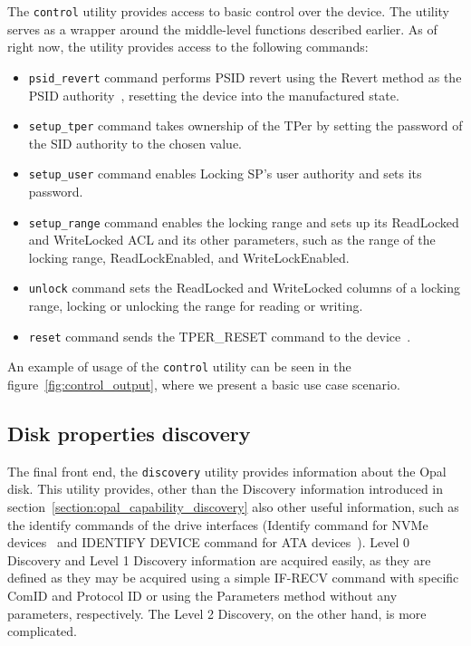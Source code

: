 The \verb|control| utility provides access to basic control over the device.
The utility serves as a wrapper around the middle-level functions described earlier.
As of right now, the utility provides access to the following commands:

\begin{itemize}
    \item \verb|psid_revert| command performs PSID revert using the Revert method as the PSID authority~\cite{tcg-psid}, resetting the device into the manufactured state.
    \item \verb|setup_tper| command takes ownership of the TPer by setting the password of the SID authority to the chosen value.
    \item \verb|setup_user| command enables Locking SP's user authority and sets its password.
    \item \verb|setup_range| command enables the locking range and sets up its ReadLocked and WriteLocked ACL and its other parameters, such as the range of the locking range, ReadLockEnabled, and WriteLockEnabled.
    \item \verb|unlock| command sets the ReadLocked and WriteLocked columns of a locking range, locking or unlocking the range for reading or writing.
    \item \verb|reset| command sends the TPER\_RESET command to the device~\cite{tcg-storage-core}.
\end{itemize}

An example of usage of the \verb|control| utility can be seen in the figure~\ref{fig:control_output}, where we present a basic use case scenario.

\subsection{Disk properties discovery}
\label{utility_discovery}

The final front end, the \verb|discovery| utility provides information about the Opal disk.
This utility provides, other than the Discovery information introduced in section~\ref{section:opal_capability_discovery} also other useful information, such as the identify commands of the drive interfaces (Identify command for NVMe devices~\cite{nvme-express-base-specification} and IDENTIFY DEVICE command for ATA devices~\cite{acs-3}).
Level 0 Discovery and Level 1 Discovery information are acquired easily, as they are defined as they may be acquired using a simple IF-RECV command with specific ComID and Protocol ID or using the Parameters method without any parameters, respectively.
The Level 2 Discovery, on the other hand, is more complicated.

